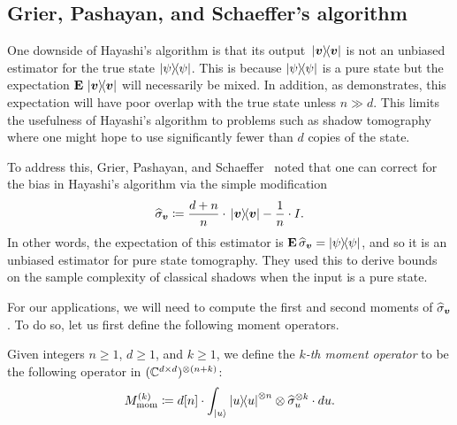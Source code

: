 \documentclass{article}
\begin{document}
\subsection{Grier, Pashayan, and Schaeffer's algorithm}\label{sec:gps}

One downside of Hayashi's algorithm is that its output $\ketbra*{\boldsymbol{v}}$ is not an unbiased estimator for the true state $\ketbra{\psi}$.
This is because $\ketbra{\psi}$ is a pure state but the expectation $\mathop{\bf E\/}\ketbra*{\boldsymbol{v}}$ will necessarily be mixed.
In addition, as  demonstrates, this expectation will have poor overlap with the true state unless $n \gg d$.
This limits the usefulness of Hayashi's algorithm to problems such as shadow tomography where one might hope to use significantly fewer than $d$ copies of the state.

To address this, Grier, Pashayan, and Schaeffer~\cite{GPS24} noted that one can correct for the bias in Hayashi's algorithm via the simple modification
\begin{equation*}
\widehat{\sigma}_{\boldsymbol{v}} \coloneqq \frac{d+n}{n} \cdot \ketbra*{\boldsymbol{v}} - \frac{1}{n} \cdot I.
\end{equation*}
In other words, the expectation of this estimator is $\mathop{\bf E\/} \widehat{\sigma}_{\boldsymbol{v}} = \ketbra{\psi}$, and so it is an unbiased estimator for pure state tomography.
They used this to derive bounds on the sample complexity of classical shadows when the input is a pure state.

For our applications, we will need to compute the first and second moments of $\widehat{\sigma}_{\boldsymbol{v}}$.
To do so, let us first define the following moment operators.

\begin{definition}
    Given integers $n \geq 1$, $d \geq 1$, and $k \geq 1$, we define the \emph{$k$-th moment operator} to be the following operator in $(\mathbb C^{d \times d})^{\otimes (n+k)}$:
    \begin{equation*}
        M_{\mathrm{mom}}^{(k)} \coloneqq d[n] \cdot \int_{\ket{u}} \ketbra{u}^{\otimes n} \otimes \widehat{\sigma}_{u}^{\otimes k} \cdot du.
    \end{equation*}
\end{definition}
\end{document}
